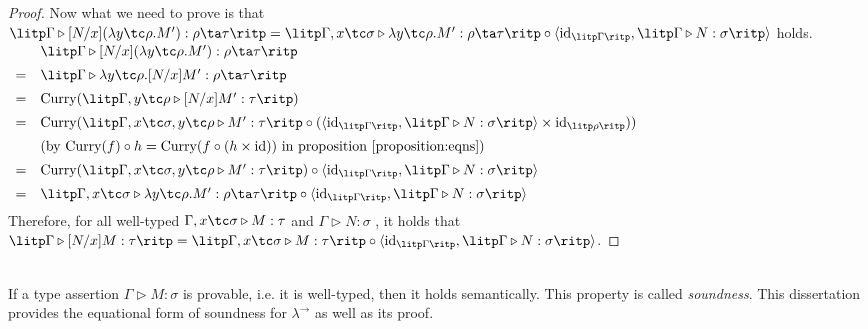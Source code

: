 \begin{proof}
Now what we need to prove is that $ \litp \Gamma \triangleright [N/x](\lambda y \tc \rho .M'): \rho \ta \tau \ritp = \litp \Gamma , x \tc \sigma \triangleright \lambda y \tc \rho .M': \rho \ta \tau \ritp \circ \langle \text{id}_{\litp \Gamma \ritp} , \litp \Gamma \triangleright N: \sigma \ritp \rangle $ holds. \\[5pt]
$
\begin{array}{rl}
   & \litp \Gamma \triangleright [N/x](\lambda y \tc \rho .M'): \rho \ta \tau \ritp \\[5pt]
 = & \litp \Gamma \triangleright \lambda y \tc \rho .[N/x]M': \rho \ta \tau \ritp \\[5pt]
 = & \text{Curry}(\litp \Gamma , y \tc \rho \triangleright [N/x]M': \tau \ritp) \\[5pt]
 = & \text{Curry}(\litp \Gamma , x \tc \sigma , y \tc \rho \triangleright M': \tau \ritp \circ ( \langle \text{id}_{\litp \Gamma \ritp} , \litp \Gamma \triangleright N: \sigma \ritp \rangle \times \text{id}_{\litp \rho \ritp} )) \\[5pt]
   & (\text{by } \text{Curry}(f) \circ h = \text{Curry}(f \circ (h \times \text{id})) \text{ in proposition \ref{proposition:eqns}}) \\[5pt]
 = & \text{Curry}(\litp \Gamma , x \tc \sigma , y \tc \rho \triangleright M': \tau \ritp) \circ \langle \text{id}_{\litp \Gamma \ritp} , \litp \Gamma \triangleright N: \sigma \ritp \rangle \\[5pt]
 = & \litp \Gamma , x \tc \sigma \triangleright \lambda y \tc \rho .M': \rho \ta \tau \ritp \circ \langle \text{id}_{\litp \Gamma \ritp} , \litp \Gamma \triangleright N: \sigma \ritp \rangle \\[5pt]
\end{array}
$\\[10pt]

Therefore, for all well-typed $ \Gamma , x \tc \sigma \triangleright M: \tau $ and $ \Gamma \triangleright N: \sigma $ , it holds that $ \litp \Gamma \triangleright [N/x]M: \tau \ritp = \litp \Gamma , x \tc \sigma \triangleright M: \tau \ritp \circ \langle \textnormal{id}_{\litp \Gamma \ritp} , \litp \Gamma \triangleright N: \sigma \ritp \rangle $.

\end{proof}
\mbox\\
\\
If a type assertion $ \Gamma \triangleright M: \sigma $ is provable, i.e. it is well-typed, then it holds semantically. This property is called \emph{soundness}. This dissertation provides the equational form of soundness for $ \lambda^{\to} $ as well as its proof.

